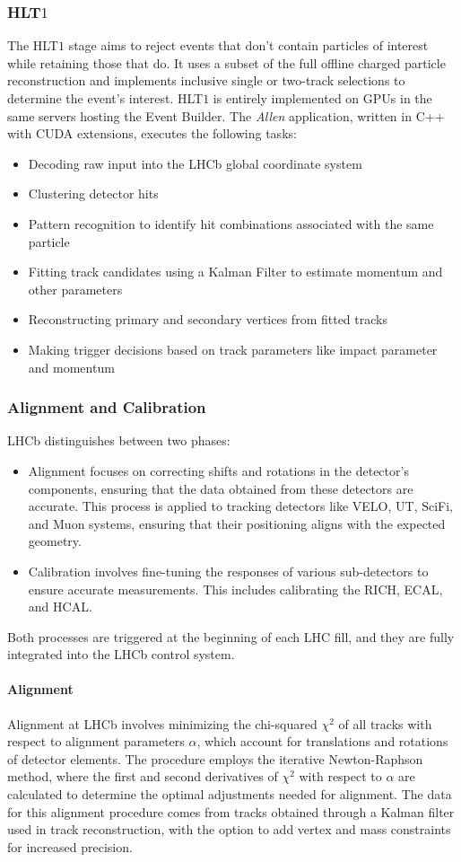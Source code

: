 \subsubsection{HLT$1$}
The HLT$1$ stage aims to reject events that don't contain particles of interest while retaining those that do. It uses a subset of the full offline charged particle reconstruction and implements inclusive single or two-track selections to determine the event's interest. HLT$1$ is entirely implemented on GPUs in the same servers hosting the Event Builder. The \textit{Allen} application, written in C++ with CUDA extensions, executes the following tasks\cite{CERN-LHCC-2020-006}:
\begin{itemize}
\item Decoding raw input into the LHCb global coordinate system
\item Clustering detector hits
\item Pattern recognition to identify hit combinations associated with the same particle
\item Fitting track candidates using a Kalman Filter to estimate momentum and other parameters
\item Reconstructing primary and secondary vertices from fitted tracks
\item Making trigger decisions based on track parameters like impact parameter and momentum
\end{itemize}
\subsubsection{Alignment and Calibration}\label{sec:alignment}
LHCb distinguishes between two phases\cite{Dziurda:2640712}:
\begin{itemize}
\item Alignment focuses on correcting shifts and rotations in the detector's components, ensuring that the data obtained from these detectors are accurate. This process is applied to tracking detectors like VELO, UT, SciFi, and Muon systems, ensuring that their positioning aligns with the expected geometry.
\item Calibration involves fine-tuning the responses of various sub-detectors to ensure accurate measurements. This includes calibrating the RICH, ECAL, and HCAL.
\end{itemize}
Both processes are triggered at the beginning of each LHC fill, and they are fully integrated into the LHCb control system. 
\paragraph{Alignment}
Alignment at LHCb involves minimizing the chi-squared $\chi^2$ of all tracks with respect to alignment parameters $\alpha$, which account for translations and rotations of detector elements. The procedure employs the iterative Newton-Raphson method, where the first and second derivatives of $\chi^2$ with respect to 
 $\alpha$ are calculated to determine the optimal adjustments needed for alignment. The data for this alignment procedure comes from tracks obtained through a Kalman filter used in track reconstruction\cite{HULSBERGEN2009471}, with the option to add vertex and mass constraints for increased precision.


